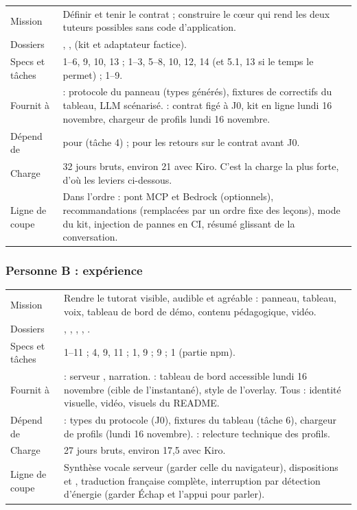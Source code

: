 \begin{xltabular}{\textwidth}{@{}L{3.2cm}Y@{}}
\toprule
Mission & Définir et tenir le contrat ; construire le cœur qui rend les deux tuteurs possibles sans code d'application. \\
Dossiers & , ,  (kit et adaptateur factice). \\
Specs et tâches &  1--6, 9, 10, 13 ;  1--3, 5--8, 10, 12, 14 (et 5.1, 13 si le temps le permet) ;  1--9. \\
Fournit à & \PB{} : protocole du panneau (types générés), fixtures de correctifs du tableau, LLM scénarisé. \PC{} : contrat figé à J0, kit en ligne lundi 16 novembre, chargeur de profils lundi 16 novembre. \\
Dépend de & \PB{} pour  (tâche 4) ; \PC{} pour les retours sur le contrat avant J0. \\
Charge & 32 jours bruts, environ 21 avec Kiro. C'est la charge la plus forte, d'où les leviers ci-dessous. \\
Ligne de coupe & Dans l'ordre : pont MCP et Bedrock (optionnels), recommandations (remplacées par un ordre fixe des leçons), mode  du kit, injection de pannes en CI, résumé glissant de la conversation. \\
\bottomrule
\end{xltabular}

\subsubsection*{\textcolor{pb}{Personne B : expérience}}

\begin{xltabular}{\textwidth}{@{}L{3.2cm}Y@{}}
\toprule
Mission & Rendre le tutorat visible, audible et agréable : panneau, tableau, voix, tableau de bord de démo, contenu pédagogique, vidéo. \\
Dossiers & , , , , . \\
Specs et tâches &  1--11 ;  4, 9, 11 ;  1, 9 ;  9 ;  1 (partie npm). \\
Fournit à & \PA{} : serveur , narration. \PC{} : tableau de bord accessible lundi 16 novembre (cible de l'instantané), style de l'overlay. Tous : identité visuelle, vidéo, visuels du README. \\
Dépend de & \PA{} : types du protocole (J0), fixtures du tableau (tâche 6), chargeur de profils (lundi 16 novembre). \PC{} : relecture technique des profils. \\
Charge & 27 jours bruts, environ 17,5 avec Kiro. \\
Ligne de coupe & Synthèse vocale serveur (garder celle du navigateur), dispositions  et , traduction française complète, interruption par détection d'énergie (garder Échap et l'appui pour parler). \\
\bottomrule
\end{xltabular}

